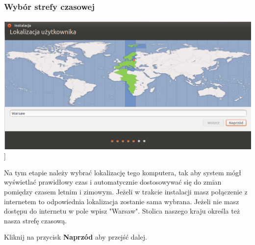 \subsubsection{Wybór strefy czasowej}
\label{subsub:instalator_strefa_czasowa}
\begin{center}
        \includegraphics[scale=0.5]{images/instalator_czas.png}]
\end{center}
Na tym etapie należy wybrać lokalizację tego komputera, tak aby system mógł wyświetlać prawidłowy czas i automatycznie dostosowywać się do zmian pomiędzy czasem letnim i zimowym. Jeżeli w trakcie instalacji masz połączenie z internetem to odpowiednia lokalizacja zostanie sama wybrana. Jeżeli nie masz dostępu do internetu w pole wpisz "Warsaw". Stolica naszego kraju określa też nasza strefę czasową.
\begin{flushright}
Kliknij na przycisk \textbf{Naprzód} aby przejść dalej.
\end{flushright}
\clearpage
